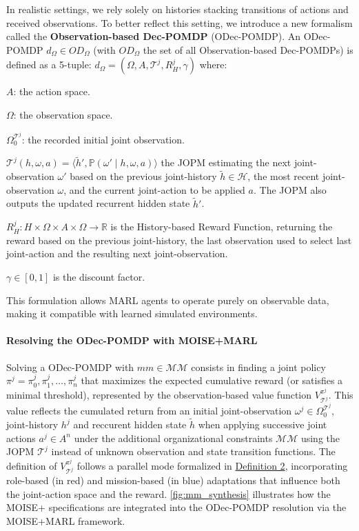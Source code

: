 \documentclass[pdflatex,sn-mathphys-num]{sn-jnl}%
\theoremstyle{thmstyleone}%
\theoremstyle{thmstyletwo}%
\theoremstyle{thmstylethree}%
\begin{document}
\noindent In realistic settings, we rely solely on histories stacking transitions of actions and received observations. To better reflect this setting, we introduce a new formalism called the \textbf{Observation-based Dec-POMDP} (ODec-POMDP).
%
An ODec-POMDP $d_\Omega \in OD_\Omega$ (with $OD_\Omega$ the set of all Observation-based Dec-POMDPs) is defined as a 5-tuple:
%
$d_\Omega = \left(\Omega, A, \mathcal{T}^j, R^j_H, \gamma \right)$
%
where:
\begin{enumerate*}[label={\roman*)}, itemjoin={; \quad}]
    \item $A$: the action space.
    \item $\Omega$: the observation space.
    \item $\Omega^{\mathcal{T}^j}_0$: the recorded initial joint observation.
    \item $\mathcal{T}^j(h, \omega, a) = \langle {\tilde{h}}', \mathbb{P}(\omega' \mid h, \omega, a) \rangle$ the JOPM estimating the next joint-observation $\omega'$ based on the previous joint-history $\tilde{h} \in \mathcal{H}$, the most recent joint-observation $\omega$, and the current joint-action to be applied $a$. The JOPM also outputs the updated recurrent hidden state $\tilde{h}'$.
    \item $R^j_H: H \times \Omega \times A \times \Omega \rightarrow \mathbb{R}$ is the History-based Reward Function, returning the reward based on the previous joint-history, the last observation used to select last joint-action and the resulting next joint-observation.
    \item $\gamma \in [0, 1]$ is the discount factor.
\end{enumerate*}
%
\noindent This formulation allows MARL agents to operate purely on observable data, making it compatible with learned simulated environments.

\paragraph{\textbf{Resolving the ODec-POMDP with MOISE+MARL}}

Solving a ODec-POMDP with $mm \in \mathcal{MM}$ consists in finding a joint policy $\pi^j = {\pi^j_0, \pi^j_1, \dots, \pi^j_n}$ that maximizes the expected cumulative reward (or satisfies a minimal threshold), represented by the observation-based value function $V_{\mathcal{T}^j}^{\pi^j}$. This value reflects the cumulated return from an initial joint-observation $\omega^j \in \Omega^{\mathcal{T}^j}_0$, joint-history $h^j$ and reccurent hidden state $\tilde{h}$ when applying successive joint actions $a^j \in A^n$ under the additional organizational constraints $\mathcal{MM}$ using the JOPM $\mathcal{T}^j$ instead of unknown observation and state transition functions.
%
The definition of $V_{\mathcal{T}^j}^{\pi^j}$ follows a parallel mode formalized in \hyperref[eq:single_value_function]{Definition 2}, incorporating role-based (in red) and mission-based (in blue) adaptations that influence both the joint-action space and the reward.
\autoref{fig:mm_synthesis} illustrates how the MOISE+ specifications are integrated into the ODec-POMDP resolution via the MOISE+MARL framework.
\end{document}
